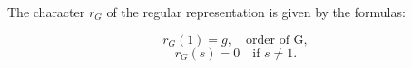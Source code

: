The character $r_G$ of the regular representation is given by the formulas:

$$r_G(1) = g, \quad \text{order of G},$$
$$r_G(s) = 0 \quad \text{if } s \neq 1.$$
